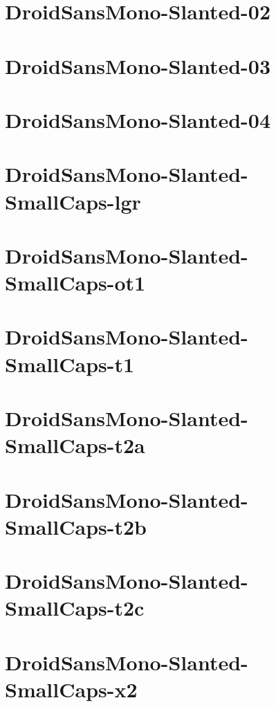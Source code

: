 \documentclass{article}
\begin{document}
\section{DroidSansMono-Slanted-02}

\section{DroidSansMono-Slanted-03}

\section{DroidSansMono-Slanted-04}

\section{DroidSansMono-Slanted-SmallCaps-lgr}

\section{DroidSansMono-Slanted-SmallCaps-ot1}

\section{DroidSansMono-Slanted-SmallCaps-t1}

\section{DroidSansMono-Slanted-SmallCaps-t2a}

\section{DroidSansMono-Slanted-SmallCaps-t2b}

\section{DroidSansMono-Slanted-SmallCaps-t2c}

\section{DroidSansMono-Slanted-SmallCaps-x2}
\end{document}
